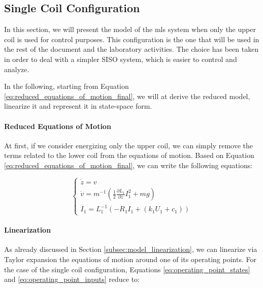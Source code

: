 \subsection{Single Coil Configuration}
\label{subsec:single_coil_configuration}

In this section, we will present the model of the \acrshort{mls} system when only the upper coil is used for control purposes.
This configuration is the one that will be used in the rest of the document and the laboratory activities.
The choice has been taken in order to deal with a simpler SISO system, which is easier to control and analyze.

In the following, starting from Equation \ref{eq:reduced_equations_of_motion_final}, we will at derive the reduced model, linearize it and represent it in state-space form.

\paragraph{Reduced Equations of Motion}

At first, if we consider energizing only the upper coil, we can simply remove the terms related to the lower coil from the equations of motion.
Based on Equation \ref{eq:reduced_equations_of_motion_final}, we can write the following equations:

\begin{equation}
    \begin{cases}
        \dot{z} = v                                                                             \\
        \dot{v} = m^{-1} \left(\frac{1}{2} \frac{\partial L_1}{\partial z} I_1^2 + m g  \right) \\
        \dot{I_1} = L_1^{-1} \left(- R_1 I_1 + (k_1 U_1 + c_1) \right)
    \end{cases}
    \label{eq:equations_of_motion_single_coil}
\end{equation}

\paragraph{Linearization}

As already discussed in Section \ref{subsec:model_linearization}, we can linearize via Taylor expansion the equations of motion around one of its operating points.
For the case of the single coil configuration, Equations \ref{eq:operating_point_states} and \ref{eq:operating_point_inputs} reduce to:

